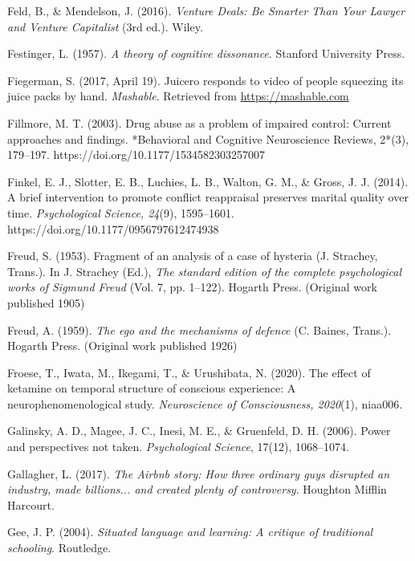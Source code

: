 \begin{thebibliography}{}
    Feld, B., \& Mendelson, J. (2016). \textit{Venture Deals: Be Smarter Than Your Lawyer and Venture Capitalist} (3rd ed.). Wiley.
    
    Festinger, L. (1957). \textit{A theory of cognitive dissonance}. Stanford University Press.

    Fiegerman, S. (2017, April 19). Juicero responds to video of people squeezing its juice packs by hand. \textit{Mashable}. Retrieved from \url{https://mashable.com}

    Fillmore, M. T. (2003). Drug abuse as a problem of impaired control: Current approaches and findings. *Behavioral and Cognitive Neuroscience Reviews, 2*(3), 179–197. https://doi.org/10.1177/1534582303257007

    Finkel, E. J., Slotter, E. B., Luchies, L. B., Walton, G. M., \& Gross, J. J. (2014). A brief intervention to promote conflict reappraisal preserves marital quality over time. \textit{Psychological Science, 24}(9), 1595–1601. https://doi.org/10.1177/0956797612474938

    Freud, S. (1953). Fragment of an analysis of a case of hysteria (J. Strachey, Trans.). In J. Strachey (Ed.), \textit{The standard edition of the complete psychological works of Sigmund Freud} (Vol. 7, pp. 1–122). Hogarth Press. (Original work published 1905)

    Freud, A. (1959). \textit{The ego and the mechanisms of defence} (C. Baines, Trans.). Hogarth Press. (Original work published 1926)

    Froese, T., Iwata, M., Ikegami, T., \& Urushibata, N. (2020). The effect of ketamine on temporal structure of conscious experience: A neurophenomenological study. \textit{Neuroscience of Consciousness, 2020}(1), niaa006.

    
    Galinsky, A. D., Magee, J. C., Inesi, M. E., \& Gruenfeld, D. H. (2006). Power and perspectives not taken. \textit{Psychological Science}, 17(12), 1068–1074.

    Gallagher, L. (2017). \textit{The Airbnb story: How three ordinary guys disrupted an industry, made billions... and created plenty of controversy}. Houghton Mifflin Harcourt.
    
    Gee, J. P. (2004). \textit{Situated language and learning: A critique of traditional schooling}. Routledge.


\end{thebibliography}
